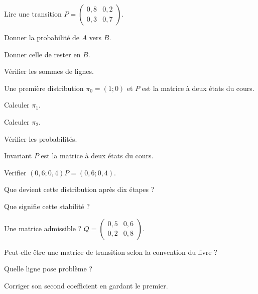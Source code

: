 \exercices
{}
\begingroup\renewcommand{\otBesoinPlace}[1]{}\begin{minipage}{\linewidth}
\begin{exercice}[1]{Lire une transition}
$P=\begin{pmatrix}0{,}8&0{,}2\\0{,}3&0{,}7\end{pmatrix}$.
\begin{questions}
\item Donner la probabilité de $A$ vers $B$.
\item Donner celle de rester en $B$.
\item Vérifier les sommes de lignes.
\end{questions}
\end{exercice}
\begin{exercice}[1]{Une première distribution}
$\pi_0=(1;0)$ et $P$ est la matrice à deux états du cours.
\begin{questions}
\item Calculer $\pi_1$.
\item Calculer $\pi_2$.
\item Vérifier les probabilités.
\end{questions}
\end{exercice}
\begin{exercice}[1]{Invariant}
$P$ est la matrice à deux états du cours.
\begin{questions}
\item Verifier $(0{,}6;0{,}4)P=(0{,}6;0{,}4)$.
\item Que devient cette distribution après dix étapes ?
\item Que signifie cette stabilité ?
\end{questions}
\end{exercice}
\begin{exercice}[1]{Une matrice admissible ?}
$Q=\begin{pmatrix}0{,}5&0{,}6\\0{,}2&0{,}8\end{pmatrix}$.
\begin{questions}
\item Peut-elle être une matrice de transition selon la convention du livre ?
\item Quelle ligne pose problème ?
\item Corriger son second coefficient en gardant le premier.
\end{questions}
\end{exercice}
\end{minipage}\endgroup
